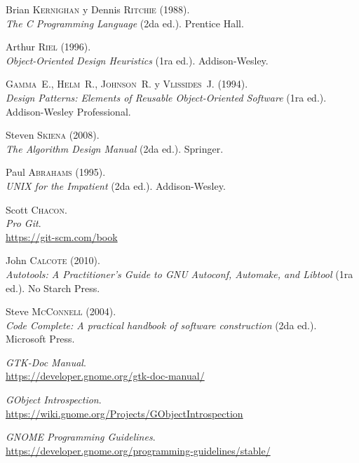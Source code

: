 \begin{thebibliography}{10}

Brian \textsc{Kernighan} y Dennis \textsc{Ritchie}
(1988).\\
\emph{The C Programming Language}
(2da ed.). Prentice Hall.

\medskip
{}
Arthur \textsc{Riel}
(1996).\\
\emph{Object-Oriented Design Heuristics}
(1ra ed.). Addison-Wesley.

\medskip
{}
\textsc{Gamma}~E., \textsc{Helm}~R., \textsc{Johnson}~R. y \textsc{Vlissides}~J.
(1994).\\
\emph{Design Patterns: Elements of Reusable Object-Oriented Software}
(1ra ed.). Addison-Wesley Professional.

\medskip
{}
Steven \textsc{Skiena}
(2008).\\
\emph{The Algorithm Design Manual}
(2da ed.). Springer.

\medskip
{}
Paul \textsc{Abrahams}
(1995).\\
\emph{UNIX for the Impatient}
(2da ed.). Addison-Wesley.

\medskip
{}
Scott \textsc{Chacon}.\\
\emph{Pro Git}.\\
\url{https://git-scm.com/book}

\medskip
{}
John \textsc{Calcote}
(2010).\\
\emph{Autotools: A Practitioner's Guide to GNU Autoconf, Automake, and Libtool}
(1ra ed.). No Starch Press.

\medskip
{}
Steve \textsc{McConnell}
(2004).\\
\emph{Code Complete: A practical handbook of software construction}
(2da ed.). Microsoft Press.

\medskip
{}
\emph{GTK-Doc Manual}.\\
\url{https://developer.gnome.org/gtk-doc-manual/}

\medskip
{}
\emph{GObject Introspection}.\\
\url{https://wiki.gnome.org/Projects/GObjectIntrospection}

\medskip
{}
\emph{GNOME Programming Guidelines}.\\
\url{https://developer.gnome.org/programming-guidelines/stable/}

\end{thebibliography}